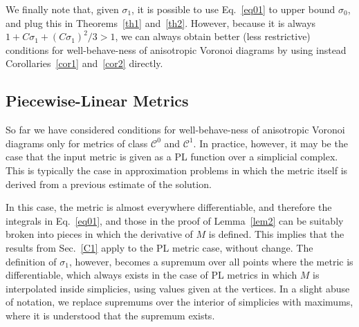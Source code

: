 \documentclass[11pt]{article}
\newcommand{\s}{\sigma}
\newcommand{\C}{\mathcal{C}}
\begin{document}
We finally note that, given $\s_1$, it is possible to use Eq.~\ref{eq01} to upper bound $\s_0$, and plug this in Theorems~\ref{th1} and~\ref{th2}. 
However, because it is always $1 + C\s_1 + (C\s_1)^2/3 > 1$,  we can always obtain better (less restrictive) conditions for well-behave-ness of anisotropic Voronoi diagrams 
by using instead  Corollaries~\ref{cor1} and~\ref{cor2} directly. 


\subsection{Piecewise-Linear Metrics}\label{sec:PL}

So far we have considered conditions for well-behave-ness of anisotropic Voronoi diagrams only for metrics of class $\C^0$ and $\C^1$. 
In practice, however, it may be the case that the input metric is given as a PL function over a simplicial complex. 
This is typically the case in approximation problems in which the metric itself is derived from a previous estimate of the solution. 


In this case, the metric is almost everywhere differentiable, and therefore the integrals in Eq.~\ref{eq01}, 
	and those in the proof of Lemma~\ref{lem2} can be suitably broken into pieces in which the derivative of $M$ is defined. 
This implies that the results from Sec.~\ref{C1} apply to the PL metric case, without change. 
The definition of $\s_1$, however, becomes a supremum over all points where the metric is differentiable, which always exists in the case of PL metrics in which $M$ is 
interpolated inside simplicies, using values given at the vertices. 
In a slight abuse of notation, we replace supremums over the interior of simplicies with maximums, where it is understood that the supremum exists. 
\end{document}
